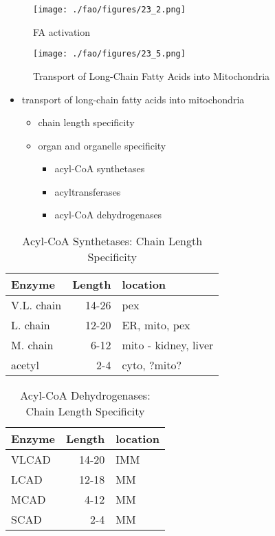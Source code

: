 \documentclass{scrartcl}
\begin{document}
\begin{figure}[htbp]
\centering
\texttt{[image: ./fao/figures/23\_2.png]}
\caption{\label{fig:orgbb21180}
FA activation}
\end{figure}


\begin{figure}[htbp]
\centering
\texttt{[image: ./fao/figures/23\_5.png]}
\caption{\label{fig:org5531b6c}
Transport of Long-Chain Fatty Acids into Mitochondria}
\end{figure}
\begin{itemize}
\item transport of long-chain fatty acids into mitochondria
\begin{itemize}
\item chain length specificity
\item organ and organelle specificity
\begin{itemize}
\item acyl-CoA synthetases
\item acyltransferases
\item acyl-CoA dehydrogenases
\end{itemize}
\end{itemize}
\end{itemize}


\begin{table}[htbp]
\caption{\label{tab:orgc62ead9}
Acyl-CoA Synthetases: Chain Length Specificity}
\centering
\begin{tabular}{lrl}
Enzyme & Length & location\\
\hline
V.L. chain & 14-26 & pex\\
L. chain & 12-20 & ER, mito, pex\\
M. chain & 6-12 & mito - kidney, liver\\
acetyl & 2-4 & cyto, ?mito?\\
\end{tabular}
\end{table}


\begin{table}[htbp]
\caption{\label{tab:org4469220}
Acyl-CoA Dehydrogenases: Chain Length Specificity}
\centering
\begin{tabular}{lrl}
Enzyme & Length & location\\
\hline
VLCAD & 14-20 & IMM\\
LCAD & 12-18 & MM\\
MCAD & 4-12 & MM\\
SCAD & 2-4 & MM\\
\end{tabular}
\end{table}
\end{document}
